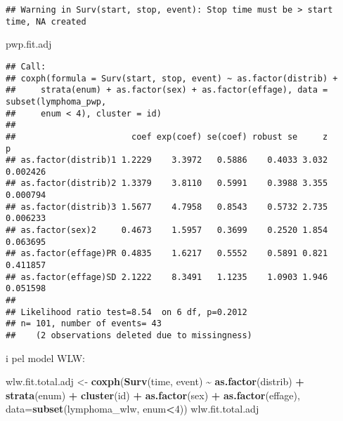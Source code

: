 \documentclass[
]{article}
\newenvironment{Shaded}{\begin{snugshade}}{\end{snugshade}}
\newcommand{\AttributeTok}[1]{\textcolor[rgb]{0.13,0.29,0.53}{#1}}
\newcommand{\DecValTok}[1]{\textcolor[rgb]{0.00,0.00,0.81}{#1}}
\newcommand{\FunctionTok}[1]{\textcolor[rgb]{0.13,0.29,0.53}{\textbf{#1}}}
\newcommand{\NormalTok}[1]{#1}
\newcommand{\OtherTok}[1]{\textcolor[rgb]{0.56,0.35,0.01}{#1}}
\newcommand{\SpecialCharTok}[1]{\textcolor[rgb]{0.81,0.36,0.00}{\textbf{#1}}}
\begin{document}
\begin{verbatim}
## Warning in Surv(start, stop, event): Stop time must be > start time, NA created
\end{verbatim}

\begin{Shaded}
\begin{Highlighting}[]
\NormalTok{pwp.fit.adj}
\end{Highlighting}
\end{Shaded}

\begin{verbatim}
## Call:
## coxph(formula = Surv(start, stop, event) ~ as.factor(distrib) + 
##     strata(enum) + as.factor(sex) + as.factor(effage), data = subset(lymphoma_pwp, 
##     enum < 4), cluster = id)
## 
##                       coef exp(coef) se(coef) robust se     z        p
## as.factor(distrib)1 1.2229    3.3972   0.5886    0.4033 3.032 0.002426
## as.factor(distrib)2 1.3379    3.8110   0.5991    0.3988 3.355 0.000794
## as.factor(distrib)3 1.5677    4.7958   0.8543    0.5732 2.735 0.006233
## as.factor(sex)2     0.4673    1.5957   0.3699    0.2520 1.854 0.063695
## as.factor(effage)PR 0.4835    1.6217   0.5552    0.5891 0.821 0.411857
## as.factor(effage)SD 2.1222    8.3491   1.1235    1.0903 1.946 0.051598
## 
## Likelihood ratio test=8.54  on 6 df, p=0.2012
## n= 101, number of events= 43 
##    (2 observations deleted due to missingness)
\end{verbatim}

i pel model WLW:

\begin{Shaded}
\begin{Highlighting}[]
\NormalTok{wlw.fit.total.adj }\OtherTok{\textless{}{-}} \FunctionTok{coxph}\NormalTok{(}\FunctionTok{Surv}\NormalTok{(time, event) }\SpecialCharTok{\textasciitilde{}} \FunctionTok{as.factor}\NormalTok{(distrib) }\SpecialCharTok{+} \FunctionTok{strata}\NormalTok{(enum) }\SpecialCharTok{+}
                  \FunctionTok{cluster}\NormalTok{(id) }\SpecialCharTok{+} \FunctionTok{as.factor}\NormalTok{(sex) }\SpecialCharTok{+} \FunctionTok{as.factor}\NormalTok{(effage), }\AttributeTok{data=}\FunctionTok{subset}\NormalTok{(lymphoma\_wlw, enum}\SpecialCharTok{\textless{}}\DecValTok{4}\NormalTok{))}
\NormalTok{wlw.fit.total.adj}
\end{Highlighting}
\end{Shaded}
\end{document}
